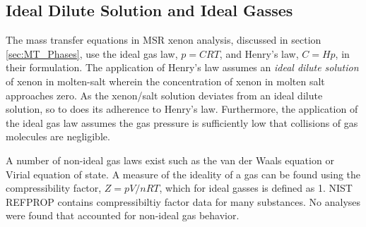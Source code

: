 \subsection{Ideal Dilute Solution and Ideal Gasses}
The mass transfer equations in MSR xenon analysis, discussed in section \ref{sec:MT_Phases}, use the ideal gas law, $p=CRT$, and Henry's law, $C=Hp$, in their formulation.  The application of Henry's law assumes an \textit{ideal dilute solution} of xenon in molten-salt wherein the concentration of xenon in molten salt approaches zero.  As the xenon/salt solution deviates from an ideal dilute solution, so to does its adherence to Henry's law.  Furthermore, the application of the ideal gas law assumes the gas pressure is sufficiently low that collisions of gas molecules are negligible.

A number of non-ideal gas laws exist such as the van der Waals equation or Virial equation of state.  A measure of the ideality of a gas can be found using the compressibility factor, $Z=pV /nRT $, which for ideal gasses is defined as 1. NIST REFPROP contains compressibiltiy factor data for many substances. \cite{Lemmon2002} No analyses were found that accounted for non-ideal gas behavior.


